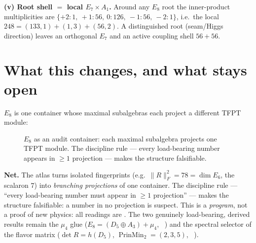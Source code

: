 \par\smallskip\noindent\textbf{(v) Root shell $=$ local $E_7\times A_1$.}
Around any $E_8$ root the inner-product multiplicities are
$\{+2{:}1,\ +1{:}56,\ 0{:}126,\ -1{:}56,\ -2{:}1\}$, i.e.\ the local
$248=(133,1){+}(1,3){+}(56,2)$. A distinguished root (seam/Higgs direction) leaves an orthogonal $E_7$
and an active coupling shell $56{+}56$. \mE

\section{What this changes, and what stays open}
$E_8$ is one container whose maximal subalgebras each project a different TFPT module:

\begin{figure}[h]\centering
{}
\caption{\small $E_8$ as an audit container: each maximal subalgebra projects one TFPT module. The
discipline rule --- every load-bearing number appears in $\ge1$ projection --- makes the structure
falsifiable.}
\end{figure}

\par\smallskip\noindent\textbf{Net.}
The atlas turns isolated fingerprints (e.g.\ $\|R\|_F^2=78=\dim E_6$, the scalaron $7$) into
\emph{branching projections} of one container. The discipline rule --- ``every load-bearing number must
appear in $\ge1$ projection'' --- makes the structure falsifiable: a number in no projection is suspect.
This is a \emph{program}, not a proof of new physics: all readings are \mO. The two genuinely
load-bearing, derived results remain the $\mu_4$ glue ($E_8=(D_5\oplus A_3)+\mu_4$, \mE\ ) and the
spectral selector of the flavor matrix ($\det R=h(D_5)$, $\operatorname{PrinMin}_2=(2,3,5)$, \mE\ ).

